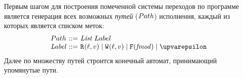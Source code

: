 

Первым шагом для построения помеченной системы переходов по программе является
генерация всех возможных \emph{путей} ($Path$) исполнения, каждый из которых является списком меток:
\[\begin{array}{l @{~} r @{~} l}
    \Path  & ::= & \ListOf{Label} \\
    \Label & ::= & \rlab{}{\loc}{\val} \mid \wlab{}{\loc}{\val}
           \mid \flab{\FtypeProm} \mid \epsilon \\
\end{array}\]
Далее по множеству путей строится конечный автомат, принимающий упомянутые пути.

